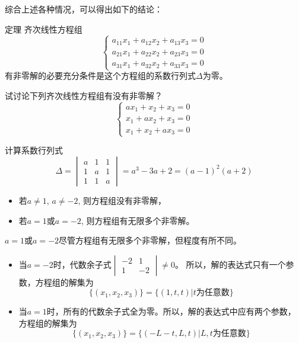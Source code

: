 综合上述各种情况，可以得出如下的结论： 



\begin{blk}{定理}
齐次线性方程组
\[\begin{cases}
    a_{11}x_1+a_{12}x_2+a_{13}x_3=0\\
a_{21}x_1+a_{22}x_2+a_{23}x_3=0\\
a_{31}x_1+a_{32}x_2+a_{33}x_3=0
\end{cases}\]
有非零解的必要充分条件是这个方程组的系数行列式$\Delta$为零。
\end{blk}

\begin{example}
试讨论下列齐次线性方程组有没有非零解？
\[\begin{cases}
    ax_1+x_2+x_3=0\\
    x_1+ax_2+x_3=0\\
    x_1+x_2+ax_3=0
\end{cases}
    \]
\end{example}

\begin{solution}
    计算系数行列式
\[\Delta=\begin{vmatrix}
    a&1&1\\1&a&1\\1&1&a
\end{vmatrix}=a^3-3a+2=(a-1)^2 (a+2)\]

\begin{itemize}
    \item 若$a\ne 1$, $a\ne-2$, 则方程组没有非零解，
    \item 若$a=1$或$a=-2$, 则方程组有无限多个非零解。
\end{itemize}
\end{solution}

\begin{rmk}
    $a=1$或$a=-2$尽管方程组有无限多个非零解，但程度有所不同。
\begin{itemize}
    \item 当$a=-2$时，代数余子式$\begin{vmatrix}
        -2&1\\1&-2
    \end{vmatrix}\ne 0$。
    所以，解的表达式只有一个参数，方程组的解集为$$\{(x_1,x_2,x_3)\}=\{(1,t,t)|\text{$t$为任意数}\}$$
    
    \item  当$a=1$时，所有的代数余子式全为零。所以，解的表达式中应有两个参数，方程组的解集为
    $$\{(x_1,x_2,x_3)\}=\{(-L-t,L,t)|\text{$L,t$为任意数}\}$$
\end{itemize}
\end{rmk}

